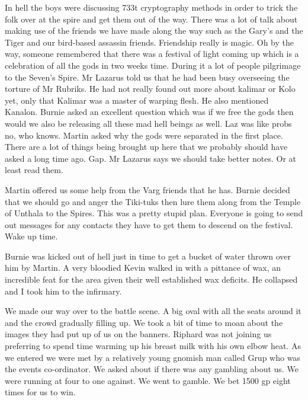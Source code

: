 In hell the boys were discussing 733t cryptography methods in order to trick the folk over at the spire and get them out of the way. There was a lot of talk about making use of the friends we have made along the way such as the Gary’s and the Tiger and our bird-based assassin friends. Friendship really is magic. Oh by the way, someone remembered that there was a festival of light coming up which is a celebration of all the gods in two weeks time. During it a lot of people pilgrimage to the Seven’s Spire. Mr Lazarus told us that he had been busy overseeing the torture of Mr Rubriks. He had not really found out more about kalimar or Kolo yet, only that Kalimar was a master of warping flesh. He also mentioned Kanalon. Burnie asked an excellent question which was if we free the gods then would we also be releasing all these mad hell beings as well. Laz was like probs no, who knows. Martin asked why the gods were separated in the first place. There are a lot of things being brought up here that we probably should have asked a long time ago. Gap. Mr Lazarus says we should take better notes. Or at least read them.\medskip

Martin offered us some help from the Varg friends that he has. Burnie decided that we should go and anger the Tiki-tuks then lure them along from the Temple of Unthala to the Spires. This was a pretty stupid plan. Everyone is going to send out messages for any contacts they have to get them to descend on the festival. Wake up time.\medskip

Burnie was kicked out of hell just in time to get a bucket of water thrown over him by Martin. A very bloodied Kevin walked in with a pittance of wax, an incredible feat for the area given their well established wax deficits. He collapsed and I took him to the infirmary.\medskip

We made our way over to the battle scene. A big oval with all the seats around it and the crowd gradually filling up. We took a bit of time to moan about the images they had put up of us on the banners. Riphard was not joining us preferring to spend time warming up his breast milk with his own elbow heat. As we entered we were met by a relatively young gnomish man called Grup who was the events co-ordinator. We asked about if there was any gambling about us. We were running at four to one against. We went to gamble. We bet 1500 gp eight times for us to win.\medskip

